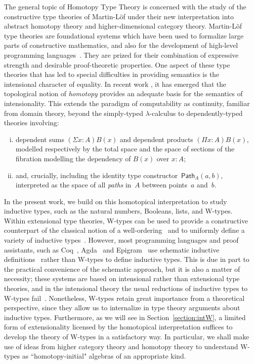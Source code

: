 \documentclass[10pt,a4paper,oneside,reqno]{amsart}
\numberwithin{equation}{section}
\theoremstyle{mythm}
\theoremstyle{mydef}
\theoremstyle{myrmk}
\newcommand{\Id}{\mathsf{Path}}
\newcommand{\id}[1]{\Id_{#1}}
\begin{document}
The general topic of Homotopy Type Theory is concerned with the study of the constructive type theories of Martin-L\"of under their new interpretation into abstract homotopy theory and higher-dimensional category theory. Martin-L\"of type theories are foundational systems which have been used to formalize large parts of constructive mathematics, and also for the development of high-level programming languages~\cite{MartinLofP:conmcp}.  They are prized for their combination of expressive strength and desirable proof-theoretic properties.  One aspect of these type theories that has led to special difficulties in providing semantics is the intensional character of equality.  In recent work \cite{AwodeyS:homtmi,VoevodskyV:notts,vandenBergB:topsmi,AwodeyS:typth}, it has emerged that the topological notion of \emph{homotopy} provides an adequate basis for the semantics of intensionality.  This extends the paradigm of computability as continuity, familiar from domain theory, beyond the simply-typed 
$\lambda$-calculus to dependently-typed theories involving:\begin{enumerate}[(i)]
\item dependent sums $(\Sigma x\colon\!{A})B(x)$ and dependent products $(\Pi x\colon\!{A})B(x)$, modelled respectively by the total space and the space of sections of the fibration modelling the dependency of $B(x)$ over $ x : A$; \item
and, crucially, including the identity type constructor~$\id{A}(a,b)$, interpreted as the space of all \emph{paths} in~$A$ between points~$a$ and~$b$. \end{enumerate}

In the present work, we build on this homotopical interpretation to study inductive types, such as the natural numbers, Booleans, lists, and W-types. Within extensional type theories, W-types can be used to  provide a constructive counterpart of the classical notion of a well-ordering~\cite{MartinLofP:inttt} and to uniformly define a variety of inductive types~\cite{DybjerP:repids}.
However, most programming languages and proof assistants, such as Coq~\cite{BertotY:inttpp}, Agda~\cite{NorellU:towppl} and Epigram~\cite{McBrideC:viefl} use schematic inductive definitions~\cite{CoquandT:inddt,PaulinMorhringC:inddsc} rather than W-types to define inductive types.  This is due in part to the practical convenience of the schematic approach, but it is also a matter of necessity; these systems are based on intensional rather than extensional type theories, and in the intensional theory the usual reductions of inductive types to W-types fail~\cite{DybjerP:repids,McBrideC:wtygnb}.
Nonetheless, W-types retain great importance from a theoretical perspective, since they allow us to internalize in type theory arguments about inductive types. Furthermore, as we will see in Section~\ref{section:intW}, a limited form of extensionality licensed by the homotopical interpretation suffices to develop the theory of W-types in a satisfactory way. In particular, we shall make use of ideas from higher category theory and homotopy theory to understand W-types as ``homotopy-initial" algebras of an appropriate kind.
\end{document}
